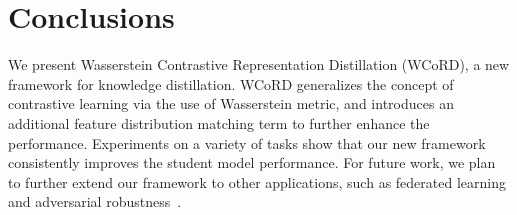 \documentclass[final]{cvpr}
\theoremstyle{definition}
\begin{document}
\section{Conclusions}

We present Wasserstein Contrastive Representation Distillation (WCoRD), a new framework for knowledge distillation.
WCoRD generalizes the concept of contrastive learning via the use of Wasserstein metric, and introduces an additional feature distribution matching term to further enhance the performance.
Experiments on a variety of tasks 
show that our new framework consistently improves the student model performance.
For future work, we plan to further extend our framework to other applications, such as federated learning \cite{konevcny2016federated} and adversarial robustness~\cite{papernot2016distillation}.


\newpage
{\small
    
    
}
\end{document}
